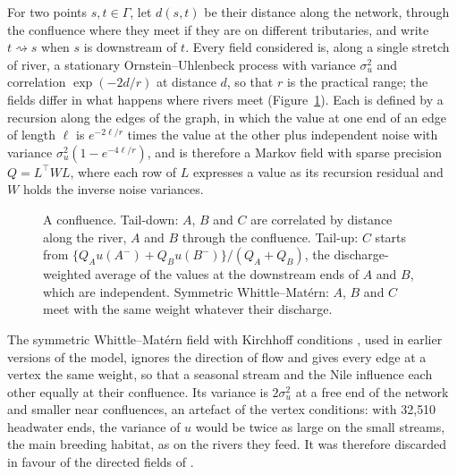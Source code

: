 \documentclass[11pt,a4paper]{article}
\begin{document}
For two points $s, t \in \Gamma$, let $d(s, t)$ be their distance along the network, through the confluence where they meet if they are on different tributaries, and write $t \rightsquigarrow s$ when $s$ is downstream of $t$. Every field considered is, along a single stretch of river, a stationary Ornstein--Uhlenbeck process with variance $\sigma_u^2$ and correlation $\exp(-2d/r)$ at distance $d$, so that $r$ is the practical range; the fields differ in what happens where rivers meet (Figure~\ref{fig:junction}). Each is defined by a recursion along the edges of the graph, in which the value at one end of an edge of length $\ell$ is $e^{-2\ell/r}$ times the value at the other plus independent noise with variance $\sigma_u^2(1 - e^{-4\ell/r})$, and is therefore a Markov field with sparse precision $Q = L^\top W L$, where each row of $L$ expresses a value as its recursion residual and $W$ holds the inverse noise variances.

\begin{figure}[H]
\centering
{}
\caption{A confluence. Tail-down: $A$, $B$ and $C$ are correlated by distance along the river, $A$ and $B$ through the confluence. Tail-up: $C$ starts from $\{Q_A u(A^-) + Q_B u(B^-)\}/(Q_A + Q_B)$, the discharge-weighted average of the values at the downstream ends of $A$ and $B$, which are independent. Symmetric Whittle--Mat\'ern: $A$, $B$ and $C$ meet with the same weight whatever their discharge.}
\label{fig:junction}
\end{figure}

The symmetric Whittle--Mat\'ern field with Kirchhoff conditions \citep{bolin2024}, used in earlier versions of the model, ignores the direction of flow and gives every edge at a vertex the same weight, so that a seasonal stream and the Nile influence each other equally at their confluence. Its variance is $2\sigma_u^2$ at a free end of the network and smaller near confluences, an artefact of the vertex conditions: with 32{,}510 headwater ends, the variance of $u$ would be twice as large on the small streams, the main breeding habitat, as on the rivers they feed. It was therefore discarded in favour of the directed fields of \citet{bolin2026dir}.
\end{document}
